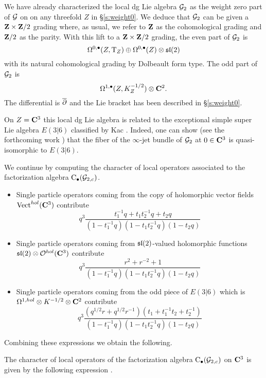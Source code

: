 We have already characterized the local dg Lie algebra $\mathcal G_{2}$ as the weight zero part of $\mathcal G$ on on any threefold $Z$ in \S\ref{s:weight0}. 
We deduce that $\mathcal G_2$ can be given a $\mathbf{Z} \times \mathbf{Z}/2$ grading where, as usual, we refer to $\mathbf{Z}$ as the cohomological grading and $\mathbf{Z}/2$ as the parity. 
With this lift to a $\mathbf{Z} \times \mathbf{Z}/2$ grading, the even part of $\mathcal G_2$ is
\[
\Omega^{0,\bullet}(Z, {\rm T}_Z) \oplus \Omega^{0,\bullet}(Z) \otimes \mathfrak{sl}(2) 
\]
with its natural cohomological grading by Dolbeault form type. 
The odd part of $\mathcal G_2$ is
\[
\Omega^{1,\bullet}(Z, K_Z^{-1/2}) \otimes \mathbf{C}^2 .
\]
The differential is $\overline{\partial}$ and the Lie bracket has been described in \S\ref{s:weight0}.

On $Z = \mathbf{C}^3$ this local dg Lie algebra is related to the exceptional simple super Lie algebra $E(3|6)$ classified by Kac \cite{s:KacClass}. 
Indeed, one can show (see the forthcoming work \cite{SW6d}) that the fiber of the $\infty$-jet bundle of $\mathcal G_2$ at $0 \in \mathbf{C}^3$ is quasi-isomorphic to $E(3|6)$. 

\parsec

We continue by computing the character of local operators associated to the factorization algebra ${\rm C}_\bullet(\mathcal G_{2,c})$. 

\begin{itemize}
\item Single particle operators coming from the copy of holomorphic vector fields $\operatorname{Vect}^{hol}(\mathbf{C}^3)$ contribute
\[
q^3 \frac{t_1^{-1} q + t_1 t_2^{-1} q + t_2 q }{(1-t_1^{-1}q) (1-t_1 t_2^{-1} q) (1-t_2 q)} 
\]
\item Single particle operators coming from $\mathfrak{sl}(2)$-valued holomorphic functions $\mathfrak{sl}(2) \otimes \mathcal O^{hol}(\mathbf{C}^3)$ contribute
\[
q^3\frac{r^2 + r^{-2} + 1}{(1-t_1^{-1}q) (1-t_1 t_2^{-1} q) (1-t_2 q)} 
\]
\item Single particle operators coming from the odd piece of $E(3|6)$ which is $\Omega^{1,hol} \otimes K^{-1/2} \otimes \mathbf{C}^2$ contribute
\[
q^{3}\frac{(q^{1/2} r + q^{1/2} r^{-1})(t_1 + t_1^{-1} t_2 + t_2^{-1})}{(1-t_1^{-1}q) (1-t_1 t_2^{-1} q) (1-t_2 q)}
\]
\end{itemize}

Combining these expressions we obtain the following.

\begin{prop} \label{prop:6dtwo}
The character of local operators of the factorization algebra ${\rm C}_\bullet(\mathcal G_{2,c})$ on $\mathbf{C}^3$ is given by the following expression
\beqn\label{eqn:6dtwo1}
 .
\eeqn
\end{prop}

